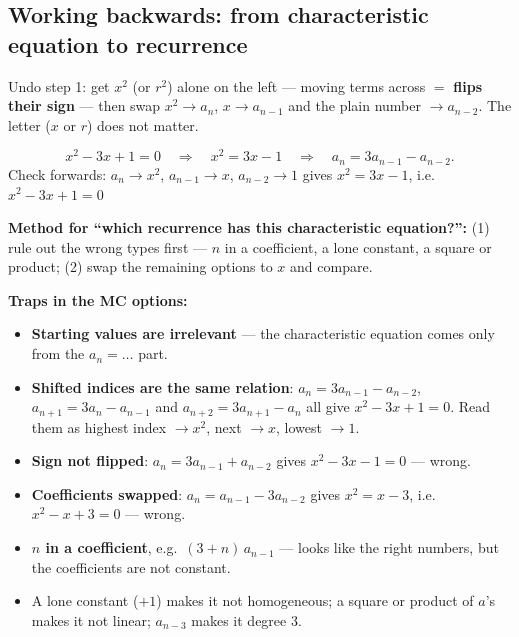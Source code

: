 \documentclass{fkt-notes}
\theoremstyle{definition}
\begin{document}
\subsection{Working backwards: from characteristic equation to recurrence}
Undo step 1: get $x^2$ (or $r^2$) alone on the left --- moving terms
across $=$ \textbf{flips their sign} --- then swap $x^2 \to a_n$,
$x \to a_{n-1}$ and the plain number $\to a_{n-2}$. The letter
($x$ or $r$) does not matter.

\begin{example}[Which recurrence has characteristic equation $x^2 - 3x + 1 = 0$?]
  \[
    x^2 - 3x + 1 = 0
    \quad\Longrightarrow\quad
    x^2 = 3x - 1
    \quad\Longrightarrow\quad
    a_n = 3a_{n-1} - a_{n-2}.
  \]
  Check forwards: $a_n \to x^2$, $a_{n-1} \to x$, $a_{n-2} \to 1$
  gives $x^2 = 3x - 1$, i.e.\ $x^2 - 3x + 1 = 0$ \checkmark
\end{example}

\noindent \textbf{Method for ``which recurrence has this characteristic
  equation?'':} (1) rule out the wrong types first --- $n$ in a
coefficient, a lone constant, a square or product; (2) swap the
remaining options to $x$ and compare.

\noindent \textbf{Traps in the MC options:}
\begin{itemize}[nosep]
  \item \textbf{Starting values are irrelevant} --- the characteristic
        equation comes only from the $a_n = \ldots$ part.
  \item \textbf{Shifted indices are the same relation}:
        $a_n = 3a_{n-1} - a_{n-2}$, $a_{n+1} = 3a_n - a_{n-1}$ and
        $a_{n+2} = 3a_{n+1} - a_n$ all give $x^2 - 3x + 1 = 0$.
        Read them as highest index $\to x^2$, next $\to x$,
        lowest $\to 1$.
  \item \textbf{Sign not flipped}: $a_n = 3a_{n-1} + a_{n-2}$ gives
        $x^2 - 3x - 1 = 0$ --- wrong.
  \item \textbf{Coefficients swapped}: $a_n = a_{n-1} - 3a_{n-2}$ gives
        $x^2 = x - 3$, i.e.\ $x^2 - x + 3 = 0$ --- wrong.
  \item \textbf{$n$ in a coefficient}, e.g.\ $(3 + n)\,a_{n-1}$ --- looks
        like the right numbers, but the coefficients are not constant.
  \item A lone constant ($+1$) makes it not homogeneous; a square or
        product of $a$'s makes it not linear; $a_{n-3}$ makes it
        degree 3.
\end{itemize}
\end{document}
